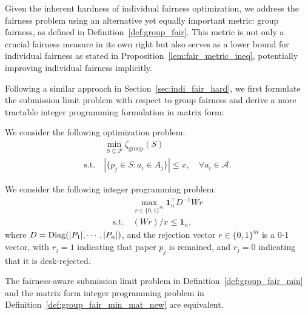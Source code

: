 Given the inherent hardness of individual fairness optimization, we address the fairness problem using an alternative yet equally important metric: group fairness, as defined in Definition~\ref{def:group_fair}. This metric is not only a crucial fairness measure in its own right but also serves as a lower bound for individual fairness as stated in Proposition~\ref{lem:fair_metric_ineq}, potentially improving individual fairness implicitly. 

Following a similar approach in Section~\ref{sec:indi_fair_hard}, we first formulate the submission limit problem with respect to group fairness and derive a more tractable integer programming formulation in matrix form:

\begin{definition}\label{def:group_fair_min}
    We consider the following optimization problem:
\begin{align*}
    & ~ \min_{S \subseteq \mathcal{P}} \zeta_{\mathrm{group}}(S) \\
    \mathrm{s.t.} & ~ |\{p_j \in S : a_i \in A_j\}| \leq x, \quad \forall a_i \in \mathcal{A}.
\end{align*}
\end{definition}


\begin{definition}\label{def:group_fair_min_mat_new}
    We consider the following integer programming problem:
    \begin{align*}
        &~ \max_{r \in \{0, 1\}^m} \mathbf{1}^\top_n D^{-1} W r \\ 
        \mathrm{s.t.} 
        & ~ (W r) / x \leq \mathbf{1}_n,
    \end{align*}
    where $D = \operatorname{Diag}(|P_1|, \cdots, |P_n|)$, and the rejection vector $r \in \{0, 1\}^m$ is a 0-1 vector, with $r_j = 1$ indicating that paper $p_j$ is remained, and $r_j = 0$ indicating that it is desk-rejected. 
\end{definition}

\begin{proposition}\label{lem:group_fair_min_equiv}
    The fairness-aware submission limit problem in Definition~\ref{def:group_fair_min} and the matrix form integer programming problem in Definition~\ref{def:group_fair_min_mat_new} are equivalent.
\end{proposition}

